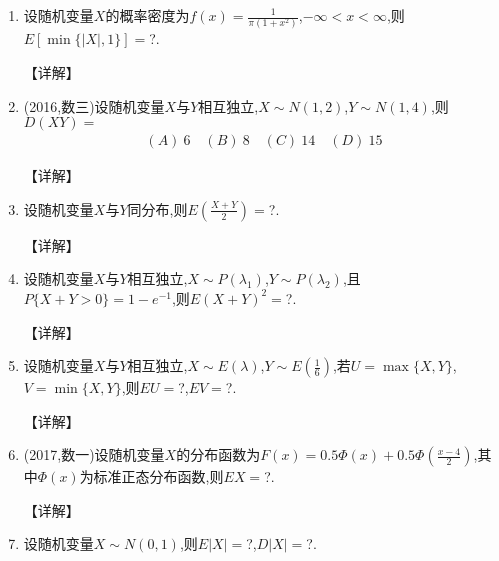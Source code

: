 \documentclass[12pt, a4paper, oneside, UTF8]{ctexbook}
\begin{document}
\begin{enumerate}[label=\arabic*.]
    \item 设随机变量$X$的概率密度为$f(x)=\frac{1}{\pi(1+x^2)}$,$-\infty<x<\infty$,则$E[\min\{|X|,1\}]=$?.
    
    \begin{solution}
    【详解】
    \end{solution}
    
    \item (2016,数三)设随机变量$X$与$Y$相互独立,$X\sim N(1,2)$,$Y\sim N(1,4)$,则$D(XY)=$
    \begin{align*}
        (A)\ 6 \quad (B)\ 8 \quad (C)\ 14 \quad (D)\ 15
    \end{align*}
    
    \begin{solution}
    【详解】
    \end{solution}
    
    \item 设随机变量$X$与$Y$同分布,则$E\left(\frac{X+Y}{2}\right)=$?.
    
    \begin{solution}
    【详解】
    \end{solution}
    
    \item 设随机变量$X$与$Y$相互独立,$X\sim P(\lambda_1)$,$Y\sim P(\lambda_2)$,且$P\{X+Y>0\}=1-e^{-1}$,则$E(X+Y)^2=$?.
    
    \begin{solution}
    【详解】
    \end{solution}
    
    \item 设随机变量$X$与$Y$相互独立,$X\sim E(\lambda)$,$Y\sim E\left(\frac{1}{6}\right)$,若$U=\max\{X,Y\}$,$V=\min\{X,Y\}$,则$EU=$?,$EV=$?.
    
    \begin{solution}
    【详解】
    \end{solution}
    
    \item (2017,数一)设随机变量$X$的分布函数为$F(x)=0.5\Phi(x)+0.5\Phi\left(\frac{x-4}{2}\right)$,其中$\Phi(x)$为标准正态分布函数,则$EX=$?.
    
    \begin{solution}
    【详解】
    \end{solution}
    
    \item 设随机变量$X\sim N(0,1)$,则$E|X|=$?,$D|X|=$?.
    

\end{enumerate}
\end{document}

